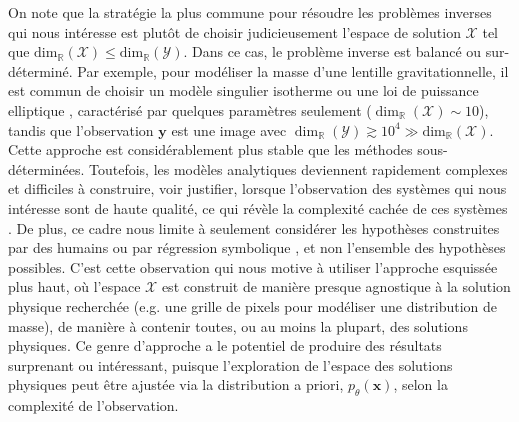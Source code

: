 On note que la stratégie la plus commune pour résoudre les problèmes inverses qui nous intéresse est plutôt de 
choisir judicieusement l'espace de solution $\mathcal{X}$ tel que $\mathrm{dim}_{\mathbb{R}}(\mathcal{X}) \leq \mathrm{dim}_{\mathbb{R}}(\mathcal{Y})$. 
Dans ce cas, le problème inverse est balancé ou sur-déterminé. 
Par exemple, pour modéliser la masse d'une lentille gravitationnelle, il est commun  
de choisir un modèle singulier isotherme ou une loi de puissance elliptique \citep[e.g.][]{Koopmans2006,Barnabe2009,Auger2010}, 
caractérisé par quelques paramètres seulement 
($\dim_{\mathbb{R}}(\mathcal{X}) \sim 10$), tandis que 
l'observation $\mathbf{y}$ est une image avec $\dim_{\mathbb{R}}(\mathcal{Y}) \gtrsim 10^{4} \gg \mathrm{dim}_{\mathbb{R}}(\mathcal{X})$. 
Cette approche est considérablement plus stable que les méthodes sous-déterminées. Toutefois, 
les modèles analytiques deviennent rapidement complexes et difficiles à construire, voir justifier, lorsque l'observation des systèmes qui nous intéresse
sont de haute qualité, ce qui révèle la complexité cachée de ces systèmes \citep[e.g.][]{Schuldt2019}. 
De plus, ce cadre nous limite à seulement considérer les hypothèses construites par des humains 
ou par régression symbolique \citep[e.g.][]{Lemos2022}, et non l'ensemble des hypothèses possibles.
C'est cette observation qui nous motive à utiliser l'approche esquissée plus haut, 
où l'espace $\mathcal{X}$ est construit de manière presque agnostique à la solution 
physique recherchée (e.g. une grille de pixels pour modéliser une distribution de masse), 
de manière à contenir toutes, ou au moins la plupart, des solutions physiques. Ce genre d'approche a 
le potentiel de produire des résultats surprenant ou intéressant, puisque l'exploration de l'espace des solutions physiques 
peut être ajustée via la distribution a priori, $p_\theta(\mathbf{x})$, selon la complexité de l'observation.

